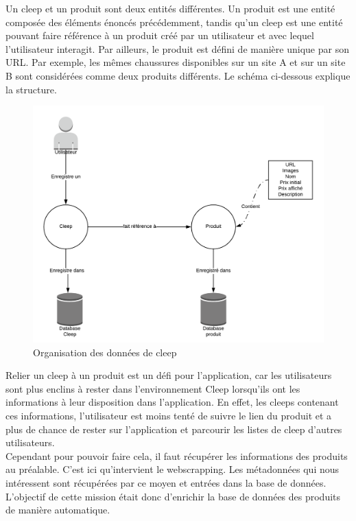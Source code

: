\documentclass{article} %
\begin{document}
Un cleep et un produit sont deux entités différentes. Un produit est une entité composée des éléments énoncés précédemment, tandis qu'un cleep est une entité pouvant faire référence à un produit créé par un utilisateur et avec lequel l'utilisateur interagit. Par ailleurs, le produit est défini de manière unique par son URL. Par exemple, les mêmes chaussures disponibles sur un site A et sur un site B sont considérées comme deux produits différents. Le schéma ci-dessous explique la structure.
\begin{figure}[!h]
 \centering
 \includegraphics[keepaspectratio = true,scale=0.7]{scrapping.png}
 \caption{Organisation des données de cleep}
\end{figure}
\newpage

Relier un cleep à un produit est un défi pour l'application, car les utilisateurs sont plus enclins à rester dans l'environnement Cleep lorsqu'ils ont les informations à leur disposition dans l'application. En effet, les cleeps contenant ces informations, l'utilisateur est moins tenté de suivre le lien du produit et a plus de chance de rester sur l'application et parcourir les listes de cleep d'autres utilisateurs. \\
Cependant pour pouvoir faire cela, il faut récupérer les informations des produits au préalable. C'est ici qu'intervient le webscrapping. Les métadonnées qui nous intéressent sont récupérées par ce moyen et entrées dans la base de données. L'objectif de cette mission était donc d'enrichir la base de données des produits de manière automatique. 
\end{document}
